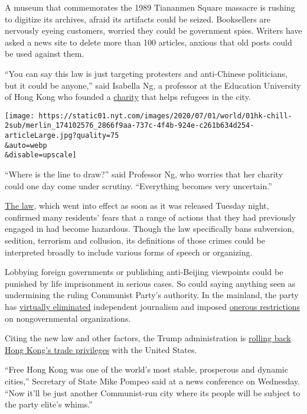 A museum that commemorates the 1989 Tiananmen Square massacre is rushing
to digitize its archives, afraid its artifacts could be seized.
Booksellers are nervously eyeing customers, worried they could be
government spies. Writers have asked a news site to delete more than 100
articles, anxious that old posts could be used against them.

``You can say this law is just targeting protesters and anti-Chinese
politicians, but it could be anyone,'' said Isabella Ng, a professor at
the Education University of Hong Kong who founded a
\href{https://www.facebook.com/HKSASR/?ref=page_internal}{charity} that
helps refugees in the city.

\texttt{[image: https://static01.nyt.com/images/2020/07/01/world/01hk-chill-2sub/merlin\_174102576\_2866f9aa-737c-4f4b-924e-c261b634d254-articleLarge.jpg?quality=75\\\&auto=webp\\\&disable=upscale]}

``Where is the line to draw?'' said Professor Ng, who worries that her
charity could one day come under scrutiny. ``Everything becomes very
uncertain.''

\href{http://www.xinhuanet.com/2020-06/30/c_1126179649.htm}{The law},
which went into effect as soon as it was released Tuesday night,
confirmed many residents' fears that a range of actions that they had
previously engaged in had become hazardous. Though the law specifically
bans subversion, sedition, terrorism and collusion, its definitions of
those crimes could be interpreted broadly to include various forms of
speech or organizing.

Lobbying foreign governments or publishing anti-Beijing viewpoints could
be punished by life imprisonment in serious cases. So could saying
anything seen as undermining the ruling Communist Party's authority. In
the mainland, the party has
\href{https://www.nytimes.com/2019/07/12/world/asia/china-journalists-crackdown.html}{virtually
eliminated} independent journalism and imposed
\href{https://www.nytimes.com/2016/04/29/world/asia/china-foreign-ngo-law.html}{onerous
restrictions} on nongovernmental organizations.

Citing the new law and other factors, the Trump administration is
\href{https://www.nytimes.com/2020/05/29/us/politics/trump-hong-kong-china-WHO.html}{rolling
back Hong Kong's trade privileges} with the United States.

``Free Hong Kong was one of the world's most stable, prosperous and
dynamic cities,'' Secretary of State Mike Pompeo said at a news
conference on Wednesday. ``Now it'll be just another Communist-run city
where its people will be subject to the party elite's whims.''

